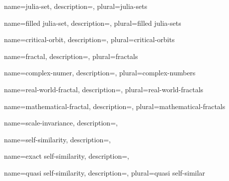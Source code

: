 {
    name={julia-set},
    description={},
    plural={julia-sets}
}

{
    name={filled julia-set},
    description={},
    plural={filled julia-sets}
}

{
    name={critical-orbit},
    description={},
    plural={critical-orbits}
}

{
    name={fractal},
    description={},
    plural={fractals}
}

{
    name={complex-numer},
    description={},
    plural={complex-numbers}
}

{
    name={real-world-fractal},
    description={},
    plural={real-world-fractals}
}

{
    name={mathematical-fractal},
    description={},
    plural={mathematical-fractals}
}

{
    name={scale-invariance},
    description={},
}

{
    name={self-similarity},
    description={},
}

{
    name={exact self-similarity},
    description={},
}

{
    name={quasi self-similarity},
    description={},
    plural={quasi self-similar}
}
